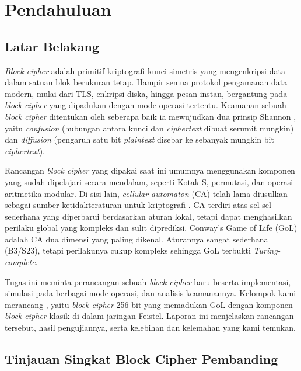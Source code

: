 \chapter{Pendahuluan}

\section{Latar Belakang}
\textit{Block cipher} adalah primitif kriptografi kunci simetris yang mengenkripsi data dalam satuan blok berukuran tetap. Hampir semua protokol pengamanan data modern, mulai dari TLS, enkripsi diska, hingga pesan instan, bergantung pada \textit{block cipher} yang dipadukan dengan mode operasi tertentu. Keamanan sebuah \textit{block cipher} ditentukan oleh seberapa baik ia mewujudkan dua prinsip Shannon \cite{shannon1949}, yaitu \textit{confusion} (hubungan antara kunci dan \textit{ciphertext} dibuat serumit mungkin) dan \textit{diffusion} (pengaruh satu bit \textit{plaintext} disebar ke sebanyak mungkin bit \textit{ciphertext}).

Rancangan \textit{block cipher} yang dipakai saat ini umumnya menggunakan komponen yang sudah dipelajari secara mendalam, seperti Kotak-S, permutasi, dan operasi aritmetika modular. Di sisi lain, \textit{cellular automaton} (CA) telah lama diusulkan sebagai sumber ketidakteraturan untuk kriptografi \cite{wolfram1986}. CA terdiri atas sel-sel sederhana yang diperbarui berdasarkan aturan lokal, tetapi dapat menghasilkan perilaku global yang kompleks dan sulit diprediksi. Conway's Game of Life (GoL) \cite{gardner1970} adalah CA dua dimensi yang paling dikenal. Aturannya sangat sederhana (B3/S23), tetapi perilakunya cukup kompleks sehingga GoL terbukti \textit{Turing-complete}.

Tugas ini meminta perancangan sebuah \textit{block cipher} baru beserta implementasi, simulasi pada berbagai mode operasi, dan analisis keamanannya. Kelompok kami merancang \textbf{\algname}, yaitu \textit{block cipher} 256-bit yang memadukan GoL dengan komponen \textit{block cipher} klasik di dalam jaringan Feistel. Laporan ini menjelaskan rancangan tersebut, hasil pengujiannya, serta kelebihan dan kelemahan yang kami temukan.

\section{Tinjauan Singkat Block Cipher Pembanding}

